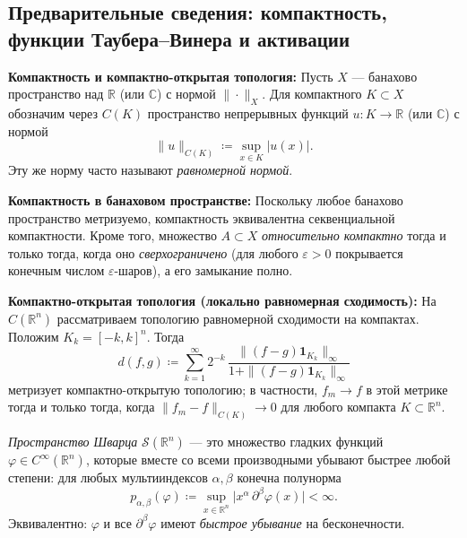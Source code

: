 \documentclass[../NDCNNAI_main.tex]{subfiles}
\begin{document}
\subsection{Предварительные сведения: компактность, функции Таубера--Винера и активации}

\textbf{Компактность и компактно-открытая топология:}
Пусть \(X\) --- банахово пространство над \(\mathbb{R}\) (или \(\mathbb{C}\)) с нормой \(\|\cdot\|_X\).
Для компактного \(K\subset X\) обозначим через \(C(K)\) пространство непрерывных функций \(u:K\to\mathbb{R}\)
(или \(\mathbb{C}\)) с нормой
\[
\|u\|_{C(K)} \coloneq \sup_{x\in K}|u(x)|.
\]
Эту же норму часто называют \emph{равномерной нормой}.

\textbf{Компактность в банаховом пространстве:}
Поскольку любое банахово пространство метризуемо, компактность эквивалентна секвенциальной компактности.
Кроме того, множество \(A\subset X\) \emph{относительно компактно} тогда и только тогда,
когда оно \emph{сверхограничено} (для любого \(\varepsilon>0\) покрывается конечным числом \(\varepsilon\)-шаров),
а его замыкание полно.

\textbf{Компактно-открытая топология (локально равномерная сходимость):}
На \(C(\mathbb{R}^n)\) рассматриваем топологию равномерной сходимости на компактах.
Положим \(K_k=[-k,k]^n\). Тогда
\[
d(f,g)\coloneq\sum_{k=1}^\infty 2^{-k}\,
\frac{\|(f-g)\mathbf{1}_{K_k}\|_\infty}{1+\|(f-g)\mathbf{1}_{K_k}\|_\infty}
\]
метризует компактно-открытую топологию; в частности,
\(f_m\to f\) в этой метрике тогда и только тогда, когда
\(\|f_m-f\|_{C(K)}\to 0\) для любого компакта \(K\subset\mathbb{R}^n\).

\begin{definition}\label{def:schwartz}
\emph{Пространство Шварца} \(\mathcal{S}(\mathbb{R}^n)\) --- это множество гладких функций
\(\varphi\in C^\infty(\mathbb{R}^n)\), которые вместе со всеми производными убывают быстрее любой степени:
для любых мультииндексов \(\alpha,\beta\) конечна полунорма
\[
p_{\alpha,\beta}(\varphi)\coloneq\sup_{x\in\mathbb{R}^n}\bigl|x^\alpha\,\partial^\beta \varphi(x)\bigr|<\infty.
\]
Эквивалентно: \(\varphi\) и все \(\partial^\beta\varphi\) имеют \emph{быстрое убывание} на бесконечности.
\end{definition}
\end{document}
